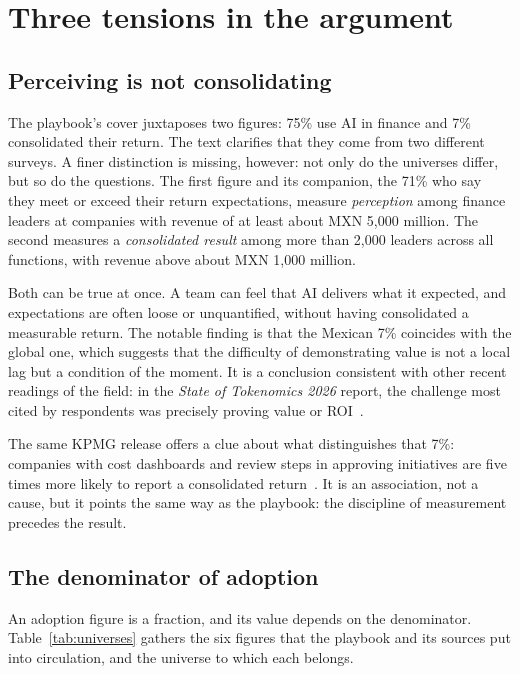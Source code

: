 \documentclass[11pt,a4paper]{article}
\begin{document}
\section{Three tensions in the argument}

\subsection{Perceiving is not consolidating}

The playbook's cover juxtaposes two figures: 75\% use AI in finance and 7\% consolidated their return. The text clarifies that they come from two different surveys. A finer distinction is missing, however: not only do the universes differ, but so do the questions. The first figure and its companion, the 71\% who say they meet or exceed their return expectations, measure \emph{perception} among finance leaders at companies with revenue of at least about MXN 5,000 million. The second measures a \emph{consolidated result} among more than 2,000 leaders across all functions, with revenue above about MXN 1,000 million.

Both can be true at once. A team can feel that AI delivers what it expected, and expectations are often loose or unquantified, without having consolidated a measurable return. The notable finding is that the Mexican 7\% coincides with the global one, which suggests that the difficulty of demonstrating value is not a local lag but a condition of the moment. It is a conclusion consistent with other recent readings of the field: in the \emph{State of Tokenomics 2026} report, the challenge most cited by respondents was precisely proving value or ROI~\cite{tokenomics}.

The same KPMG release offers a clue about what distinguishes that 7\%: companies with cost dashboards and review steps in approving initiatives are five times more likely to report a consolidated return~\cite{kpmgpulse}. It is an association, not a cause, but it points the same way as the playbook: the discipline of measurement precedes the result.

\subsection{The denominator of adoption}

An adoption figure is a fraction, and its value depends on the denominator. Table~\ref{tab:universes} gathers the six figures that the playbook and its sources put into circulation, and the universe to which each belongs.
\end{document}
